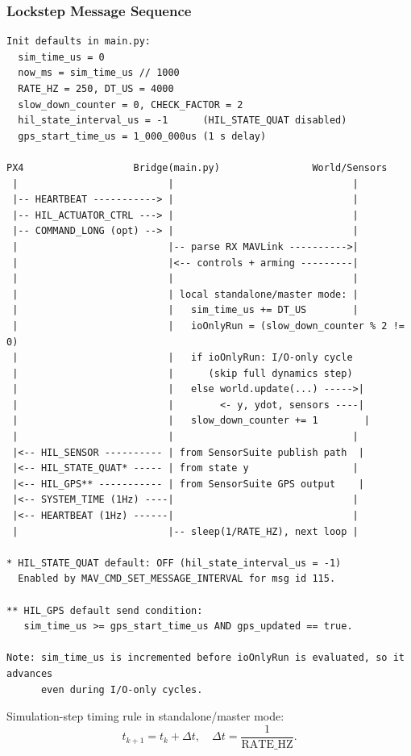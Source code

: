 \documentclass[11pt,a4paper]{article}
\begin{document}
\subsubsection*{Lockstep Message Sequence}
{\footnotesize
\begin{verbatim}
Init defaults in main.py:
  sim_time_us = 0
  now_ms = sim_time_us // 1000
  RATE_HZ = 250, DT_US = 4000
  slow_down_counter = 0, CHECK_FACTOR = 2
  hil_state_interval_us = -1      (HIL_STATE_QUAT disabled)
  gps_start_time_us = 1_000_000us (1 s delay)

PX4                   Bridge(main.py)                World/Sensors
 |                          |                               |
 |-- HEARTBEAT -----------> |                               |
 |-- HIL_ACTUATOR_CTRL ---> |                               |
 |-- COMMAND_LONG (opt) --> |                               |
 |                          |-- parse RX MAVLink ---------->|
 |                          |<-- controls + arming ---------|
 |                          |                               |
 |                          | local standalone/master mode: |
 |                          |   sim_time_us += DT_US        |
 |                          |   ioOnlyRun = (slow_down_counter % 2 != 0)
 |                          |   if ioOnlyRun: I/O-only cycle
 |                          |      (skip full dynamics step)
 |                          |   else world.update(...) ----->|
 |                          |        <- y, ydot, sensors ----|
 |                          |   slow_down_counter += 1        |
 |                          |                               |
 |<-- HIL_SENSOR ---------- | from SensorSuite publish path  |
 |<-- HIL_STATE_QUAT* ----- | from state y                  |
 |<-- HIL_GPS** ----------- | from SensorSuite GPS output    |
 |<-- SYSTEM_TIME (1Hz) ----|                               |
 |<-- HEARTBEAT (1Hz) ------|                               |
 |                          |-- sleep(1/RATE_HZ), next loop |

* HIL_STATE_QUAT default: OFF (hil_state_interval_us = -1)
  Enabled by MAV_CMD_SET_MESSAGE_INTERVAL for msg id 115.

** HIL_GPS default send condition:
   sim_time_us >= gps_start_time_us AND gps_updated == true.

Note: sim_time_us is incremented before ioOnlyRun is evaluated, so it advances
      even during I/O-only cycles.
\end{verbatim}
}

Simulation-step timing rule in standalone/master mode:
\begin{equation}
t_{k+1} = t_k + \Delta t, \quad \Delta t = \frac{1}{\text{RATE\_HZ}}.
\end{equation}
\end{document}
